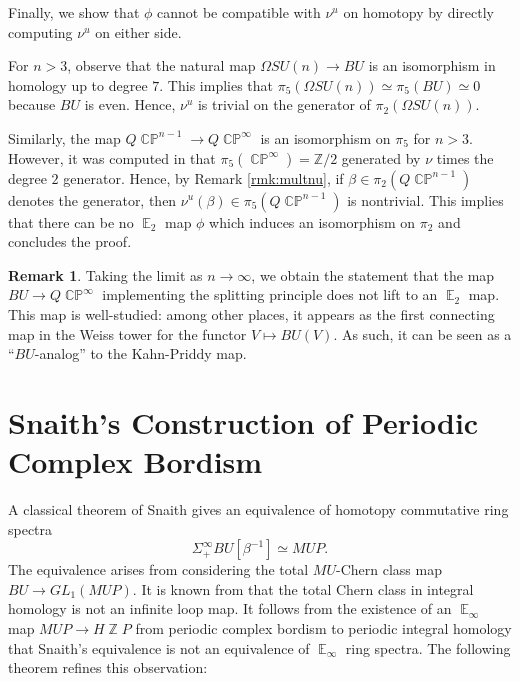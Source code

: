 \documentclass[reqno, oneside]{amsart}
\theoremstyle{definition}
\newtheorem{rmk}[nul]{Remark}
\theoremstyle{plain}
\DeclareMathOperator{\CP}{\mathbb{CP}}
\DeclareMathOperator{\Z}{\mathbb{Z}}
\DeclareMathOperator{\E}{\mathbb{E}}
\begin{document}
Finally, we show that $\phi$ cannot be compatible with $\nu^u$ on homotopy by directly computing $\nu^u$ on either side.

For $n>3$, observe that the natural map $\Omega SU(n) \to BU$ is an isomorphism in homology up to degree $7$.  This implies that $\pi_5(\Omega SU(n)) \simeq \pi_5(BU) \simeq 0$ because $BU$ is even.  Hence, $\nu^u$ is trivial on the generator of $\pi_2(\Omega SU(n)).$  

Similarly, the map $Q\CP^{n-1} \to Q\CP^\infty$ is an isomorphism on $\pi_5$ for $n>3$.  However, it was computed in \cite[Theorem II.8]{Liulevicius} that $\pi_5(\CP^{\infty})=\mathbb{Z}/2$ generated by $\nu$ times the degree $2$ generator.  Hence, by Remark \ref{rmk:multnu}, if $\beta\in \pi_2(Q\CP^{n-1})$ denotes the generator, then $\nu^u(\beta)\in \pi_5(Q\CP^{n-1})$ is nontrivial.  This implies that there can be no $\E_2$ map $\phi$ which induces an isomorphism on $\pi_2$ and concludes the proof.  

\begin{rmk}%
Taking the limit as $n\to\infty$, we obtain the statement that the map $BU\to Q\CP^{\infty}$ implementing the splitting principle does not lift to an $\E_2$ map.  This map is well-studied: among other places, it appears as the first connecting map in the Weiss tower for the functor $V\mapsto BU(V)$.  As such, it can be seen as a ``$BU$-analog'' to the Kahn-Priddy map.  
\end{rmk}


\section{Snaith's Construction of Periodic Complex Bordism} \label{sec:SnaithSplitting}

A classical theorem of Snaith \cite{SnaithOriginal} gives an equivalence of homotopy commutative ring spectra $$\Sigma^{\infty}_+ BU [\beta^{-1}] \simeq MUP.$$  The equivalence arises from considering the total $MU$-Chern class map $BU \to GL_1(MUP).$  It is known from \cite{SnaithNotMultiplicative} that the total Chern class in integral homology is not an infinite loop map.  It follows from the existence of an $\E_\infty$ map $MUP \to H\Z P$ from periodic complex bordism to periodic integral homology that Snaith's equivalence is not an equivalence of $\E_\infty$ ring spectra.  The following theorem refines this observation:
\end{document}
